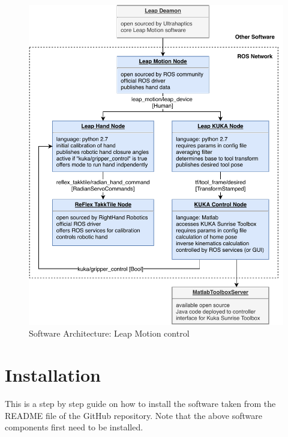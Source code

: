 \documentclass[headsepline,footinclude=false,fontsize=11pt,paper=a4,listof=totoc,bibliography=totoc,BCOR=12mm,DIV=14]{scrbook}
\begin{document}
\begin{figure}[p]
    \centering
    \includegraphics[width=\textwidth]{images/software}
    \caption{Software Architecture: Leap Motion control}
    \label{fig:software_architecture}
\end{figure}

\section{Installation}

This is a step by step guide on how to install the software taken from the README file of the GitHub repository. Note that the above software components first need to be installed.
\end{document}
